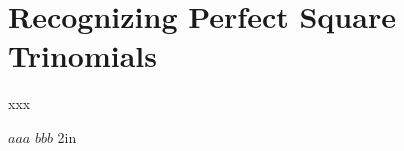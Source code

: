 \section{Recognizing Perfect Square Trinomials}


xxx

\myProblems
{
    $aaa$
}
{
    $bbb$
}
{2in}
